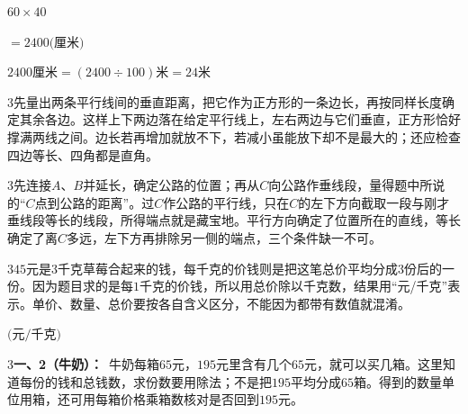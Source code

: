\documentclass[multi=snippet,border={5bp 20bp 5bp 5bp}]{standalone}
\newenvironment{snippet}[3]{\begin{minipage}{#1bp}\color{answerred}\fontsize{#2}{#3}\selectfont\raggedright}{\end{minipage}}
\begin{document}
\begin{snippet}{505}{10.0}{14}\SourceSans\setlength{\mathindent}{2bp}\(60\times40\)\end{snippet}
\begin{snippet}{505}{10.0}{14}\SourceSans\setlength{\mathindent}{2bp}\(=2400\text{(厘米)}\)\end{snippet}
\begin{snippet}{505}{10.0}{14}\SourceSans\setlength{\mathindent}{2bp}\(2400\text{厘米}=(2400\div100)\text{米}=24\text{米}\)\end{snippet}
\begin{snippet}{505}{11.5}{14}\begin{multicols}{3}\raggedcolumns 先量出两条平行线间的垂直距离，把它作为正方形的一条边长，再按同样长度确定其余各边。这样上下两边落在给定平行线上，左右两边与它们垂直，正方形恰好撑满两线之间。边长若再增加就放不下，若减小虽能放下却不是最大的；还应检查四边等长、四角都是直角。\end{multicols}\end{snippet}
\begin{snippet}{505}{11.5}{14}\begin{multicols}{3}\raggedcolumns 先连接\(A\)\allowbreak 、\(B\)\allowbreak 并延长，确定公路的位置；再从\(C\)\allowbreak 向公路作垂线段，量得题中所说的“\(C\)\allowbreak 点到公路的距离”。过\(C\)\allowbreak 作公路的平行线，只在\(C\)\allowbreak 的左下方向截取一段与刚才垂线段等长的线段，所得端点就是藏宝地。平行方向确定了位置所在的直线，等长确定了离\(C\)\allowbreak 多远，左下方再排除另一侧的端点，三个条件缺一不可。\end{multicols}\end{snippet}
\begin{snippet}{505}{11.5}{14}\begin{multicols}{3}\raggedcolumns \(45\)\allowbreak 元是\(3\)\allowbreak 千克草莓合起来的钱，每千克的价钱则是把这笔总价平均分成\(3\)\allowbreak 份后的一份。因为题目求的是每\(1\)\allowbreak 千克的价钱，所以用总价除以千克数，结果用“元/千克”表示。单价、数量、总价要按各自含义区分，不能因为都带有数值就混淆。\end{multicols}\end{snippet}
\begin{snippet}{80}{9.5}{14}\SourceSans\setlength{\mathindent}{2bp}\(\text{(元/千克)}\)\end{snippet}
\begin{snippet}{505}{11.5}{14}\begin{multicols}{3}\raggedcolumns \textbf{一、2（牛奶）：}\ 牛奶每箱\(65\)\allowbreak 元，\(195\)\allowbreak 元里含有几个\(65\)\allowbreak 元，就可以买几箱。这里知道每份的钱和总钱数，求份数要用除法；不是把\(195\)\allowbreak 平均分成\(65\)\allowbreak 箱。得到的数量单位用箱，还可用每箱价格乘箱数核对是否回到\(195\)\allowbreak 元。\end{multicols}\end{snippet}
\end{document}
